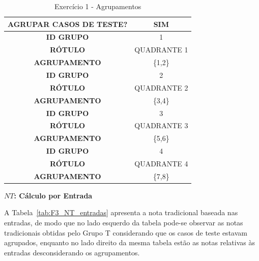 \begin{table}[htbp]
	\centering
	\caption{Exercício 1 - Agrupamentos}
	\begin{tabular}{|c|c|}
		\hline
		\cellcolor[HTML]{C0C0C0}\textbf{AGRUPAR CASOS DE TESTE?} & SIM \\ \hline
		\cellcolor[HTML]{DEDEDE}\textbf{ID GRUPO} & \cellcolor[HTML]{DEDEDE}1\\ \hline
		\textbf{RÓTULO} & QUADRANTE 1 \\ \hline
		\textbf{AGRUPAMENTO} & \{1,2\}\\ \hline
		\cellcolor[HTML]{DEDEDE}\textbf{ID GRUPO} & \cellcolor[HTML]{DEDEDE}2\\ \hline
		\textbf{RÓTULO} & QUADRANTE 2 \\ \hline
		\textbf{AGRUPAMENTO} & \{3,4\}\\ \hline
		\cellcolor[HTML]{DEDEDE}\textbf{ID GRUPO} & \cellcolor[HTML]{DEDEDE}3\\ \hline
		\textbf{RÓTULO} & QUADRANTE 3 \\ \hline
		\textbf{AGRUPAMENTO} & \{5,6\}\\ \hline
		\cellcolor[HTML]{DEDEDE}\textbf{ID GRUPO} & \cellcolor[HTML]{DEDEDE}4\\ \hline
		\textbf{RÓTULO} & QUADRANTE 4 \\ \hline
		\textbf{AGRUPAMENTO} & \{7,8\}\\ \hline	
	\end{tabular}
	\label{tab:F3_Agrupamentos}
\end{table}

\textbf{$NT$: Cálculo por Entrada}

A Tabela~\ref{tab:F3_NT_entradas} apresenta a nota tradicional baseada nas entradas, de modo que no lado esquerdo da tabela pode-se observar as notas tradicionais obtidas pelo Grupo T considerando que os casos de teste estavam agrupados, enquanto no lado direito da mesma tabela estão as notas relativas às entradas desconsiderando os agrupamentos. 

